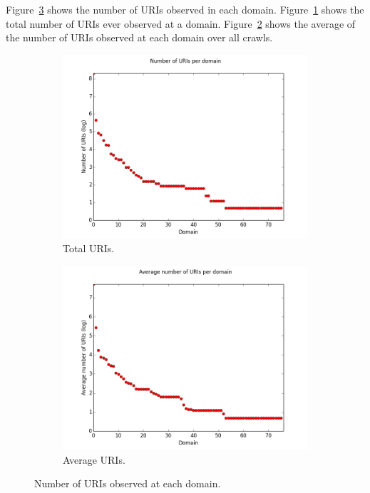 \documentclass[11pt]{article}
\begin{document}
Figure~\ref{fig:uris_per_domain} shows the number of URIs observed in each domain. Figure~\ref{fig:uris_per_domain:a} shows the total number of URIs ever observed at a domain. Figure~\ref{fig:uris_per_domain:b} shows the average of the number of URIs observed at each domain over all crawls.


\begin{figure}
\centering
\begin{subfigure}{.5\textwidth}
  \centering
  \includegraphics[width=\linewidth]{images/uris_per_domain.png}
  \caption{Total URIs.}
  \label{fig:uris_per_domain:a}
\end{subfigure}%
\begin{subfigure}{.5\textwidth}
  \centering
  \includegraphics[width=\linewidth]{images/uris_per_domain_avg.png}
  \caption{Average URIs.}
  \label{fig:uris_per_domain:b}
\end{subfigure}
\caption{Number of URIs observed at each domain.}
\label{fig:uris_per_domain}
\end{figure}
\end{document}
